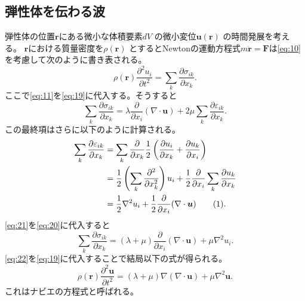 \documentclass[dvipdfmx]{jsreport}
\numberwithin{equation}{chapter}
\numberwithin{table}{chapter}
\begin{document}
\subsection{弾性体を伝わる波}
弾性体の位置$\bm{r}$にある微小な体積要素$dV$ の微小変位$\bm{u}(\bm{r})$ の時間発展を考える。
$\bm{r}$における質量密度を$\rho(\bm{r})$ とするとNewtonの運動方程式$m \ddot{\bm{r}}=\bm{F}$は\eqref{eq:10}
を考慮して次のように書き表される。
\begin{equation}
\label{eq:19}
	\rho(\bm{r})\frac{\partial ^2 u_i}{\partial t^2} =\sum_{k}^{} \frac{\partial \sigma_{ik}}{\partial x_k} 
.\end{equation}
ここで\eqref{eq:11}を\eqref{eq:19}に代入する。そうすると
\begin{equation}
\label{eq:20}
	\sum_{k}^{} \frac{\partial \sigma_{ik}}{\partial x_k} =\lambda \frac{\partial }{\partial x_i} (\nabla \cdot \bm{u})+2\mu \sum_{k}^{} \frac{\partial \varepsilon_{ik}}{\partial x_k} 
.\end{equation}
この最終項はさらに以下のように計算される。
\begin{align*}
	\label{eq:21}
	\sum_{k}^{} \frac{\partial \varepsilon_{ik}}{\partial x_k} &= \sum_{k}^{} \frac{\partial }{\partial x_k} \frac{1}{2}\left( \frac{\partial u_i}{\partial x_k} +\frac{\partial u_k}{\partial x_i}  \right)  \\
	&= \frac{1}{2}\left( \sum_{k}^{} \frac{\partial ^2}{\partial x_k^2}  \right)u_i+\frac{1}{2}\frac{\partial }{\partial x_i} \sum_{k}^{} \frac{\partial u_k}{\partial x_k}   \\
	&= \frac{1}{2}\nabla ^2u_i+\frac{1}{2}\frac{\partial }{\partial x_i} (\nabla \cdot \bm{u}) 
	\stepcounter{equation}\tag{\theequation} 
.\end{align*}
\eqref{eq:21}を\eqref{eq:20}に代入すると
\begin{equation}
\label{eq:22}
	\sum_{k}^{} \frac{\partial \sigma_{ik}}{\partial x_k} =(\lambda+\mu)\frac{\partial }{\partial x_i} (\nabla \cdot \bm{u})+\mu \nabla ^2u_i
.\end{equation}
\eqref{eq:22}を\eqref{eq:19}に代入することで結局以下の式が得られる。
\begin{equation}
\label{eq:23}
	\rho(\bm{r})\frac{\partial ^2\bm{u}}{\partial t^2} =(\lambda+\mu)\nabla (\nabla \cdot \bm{u})+\mu\nabla ^2\bm{u}
.\end{equation}
これはナビエの方程式と呼ばれる。
\end{document}
